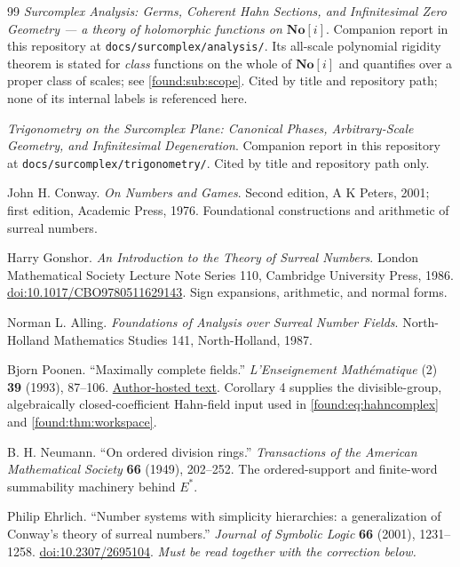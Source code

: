\documentclass[11pt,letterpaper]{article}
\numberwithin{equation}{section}
\theoremstyle{definition}
\theoremstyle{remark}
\newcommand{\No}{\mathbf{No}}
\begin{document}
\begin{thebibliography}{99}
\emph{Surcomplex Analysis: Germs, Coherent Hahn Sections, and Infinitesimal Zero
Geometry --- a theory of holomorphic functions on $\No[i]$}. Companion report in
this repository at \texttt{docs/surcomplex/analysis/}. Its all-scale polynomial
rigidity theorem is stated for \emph{class} functions on the whole of $\No[i]$
and quantifies over a proper class of scales; see \cref{found:sub:scope}. Cited
by title and repository path; none of its internal labels is referenced here.

\emph{Trigonometry on the Surcomplex Plane: Canonical Phases, Arbitrary-Scale
Geometry, and Infinitesimal Degeneration}. Companion report in this repository at
\texttt{docs/surcomplex/trigonometry/}. Cited by title and repository path only.

John H. Conway. \emph{On Numbers and Games}. Second edition, A K Peters, 2001;
first edition, Academic Press, 1976. Foundational constructions and arithmetic of
surreal numbers.

Harry Gonshor. \emph{An Introduction to the Theory of Surreal Numbers}. London
Mathematical Society Lecture Note Series 110, Cambridge University Press, 1986.
\href{https://doi.org/10.1017/CBO9780511629143}{doi:10.1017/CBO9780511629143}.
Sign expansions, arithmetic, and normal forms.

Norman L. Alling. \emph{Foundations of Analysis over Surreal Number Fields}.
North-Holland Mathematics Studies 141, North-Holland, 1987.

Bjorn Poonen. ``Maximally complete fields.'' \emph{L'Enseignement
Math\'ematique} (2) \textbf{39} (1993), 87--106.
\href{https://math.mit.edu/~poonen/papers/amsval.pdf}{Author-hosted text}.
Corollary 4 supplies the divisible-group, algebraically closed-coefficient
Hahn-field input used in \cref{found:eq:hahncomplex} and
\cref{found:thm:workspace}.

B. H. Neumann. ``On ordered division rings.'' \emph{Transactions of the American
Mathematical Society} \textbf{66} (1949), 202--252. The ordered-support and
finite-word summability machinery behind $E^*$.

Philip Ehrlich. ``Number systems with simplicity hierarchies: a generalization of
Conway's theory of surreal numbers.'' \emph{Journal of Symbolic Logic}
\textbf{66} (2001), 1231--1258.
\href{https://doi.org/10.2307/2695104}{doi:10.2307/2695104}. \emph{Must be read
together with the correction below.}


\end{thebibliography}
\end{document}

